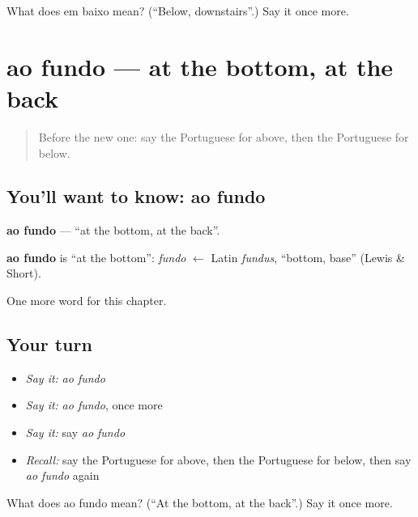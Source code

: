 \begin{tcolorbox}[breakable,colback=teal!4,colframe=teal!35!black,title={Before you move on}]
What does em baixo mean? (\textquotedblleft{}Below, downstairs\textquotedblright{}.) Say it once more.
\end{tcolorbox}
\section[ao fundo]{ao fundo — at the bottom, at the back}

\label{lesson:PT-C151-ao-fundo}



\begin{quote}
Before the new one: say the Portuguese for above, then the Portuguese for below.
\end{quote}

\subsection*{You'll want to know: ao fundo}
\textbf{ao fundo} — \textquotedblleft{}at the bottom, at the back\textquotedblright{}.

\begin{cousinweb}
\textbf{ao fundo} is \textquotedblleft{}at the bottom\textquotedblright{}: \emph{fundo} $\leftarrow$ Latin \emph{fundus}, \textquotedblleft{}bottom, base\textquotedblright{} (Lewis \& Short).
\end{cousinweb}

\begin{grammarlens}[title={What you've built}]
One more word for this chapter.
\end{grammarlens}

\subsection*{Your turn}
\begin{itemize}
\raggedright
  \item \emph{Say it:} \emph{ao fundo}
  \item \emph{Say it:} \emph{ao fundo}, once more
  \item \emph{Say it:} say \emph{ao fundo}
  \item \emph{Recall:} say the Portuguese for above, then the Portuguese for below, then say \emph{ao fundo} again
\end{itemize}

\begin{tcolorbox}[breakable,colback=teal!4,colframe=teal!35!black,title={Before you move on}]
What does ao fundo mean? (\textquotedblleft{}At the bottom, at the back\textquotedblright{}.) Say it once more.
\end{tcolorbox}
